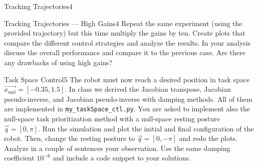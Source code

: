\begin{questions}
\begin{question}{Tracking Trajectories}{4}
\begin{answer}
\end{answer}
		
	\end{question}
	
	
	\begin{question}{Tracking Trajectories --- High Gains}{4}
		Repeat the same experiment (using the provided trajectory) but this time multiply the gains by ten. Create plots that compare the different control strategies and analyze the results. In your analysis discuss the overall performance and compare it to the previous case. Are there any drawbacks of using high gains?
		
\begin{answer}
\end{answer}
		
	\end{question}
	
	
	\begin{question}[bonus]{Task Space Control}{5}
		The robot must now reach a desired position in task space $\vec{x_\textrm{end}}={[-0.35,1.5]}$. In class we derived the Jacobian transpose, Jacobian pseudo-inverse, and Jacobian pseudo-inverse with damping methods. All of them are implemented in \texttt{my\_taskSpace\_ctl.py}. You are asked to implement also the null-space task prioritization method with a null-space resting posture $\vec q=[0,\pi]$. Run the simulation and plot the initial and final configuration of the robot. Then, change the resting posture to $\vec q=[0,-\pi]$ and redo the plots. Analyze in a couple of sentences your observation. Use the same damping coefficient $10^{-6}$ and include a code snippet to your solutions.
		
\begin{answer}
\end{answer}
		
	\end{question}
	
\end{questions}

